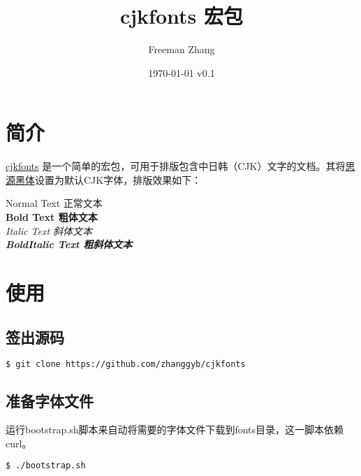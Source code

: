 \documentclass[oneside,final]{article}
\begin{document}
\title{cjkfonts 宏包}
\author{Freeman Zhang}
\date{\today{} v0.1}

\maketitle

\section{简介}

\href{https://github.com/zhanggyb/cjkfonts}{cjkfonts} 是一个简单的\XeLaTeX{}宏包，可用于排版包含中日韩（CJK）文字的文档。其将\href{https://github.com/adobe-fonts/source-han-sans}{思源黑体}设置为默认CJK字体，排版效果如下：

\begin{center}
  Normal Text {\SourceHanSansSC 正常文本} \\
  \vspace{1em}
  \textbf{Bold Text {\SourceHanSansSC 粗体文本}} \\
  \vspace{1em}
  \textit{Italic Text {\SourceHanSansSC 斜体文本}} \\
  \vspace{1em}
  \textbf{\textit{BoldItalic Text {\SourceHanSansSC 粗斜体文本}}}
\end{center}

\section{使用}

\subsection{签出源码}

\begin{lstlisting}[language=sh]
$ git clone https://github.com/zhanggyb/cjkfonts
\end{lstlisting}

\subsection{准备字体文件}

运行bootstrap.sh脚本来自动将需要的字体文件下载到fonts目录，这一脚本依赖curl。

\begin{lstlisting}[language=sh]
$ ./bootstrap.sh
\end{lstlisting}
\end{document}
